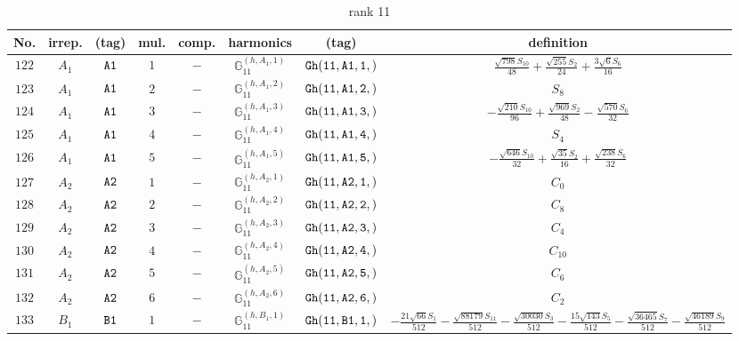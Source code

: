 \documentclass[fleqn,8pt]{jsarticle}
\begin{document}
\begin{table}[ht!]
\begin{center}
\caption{rank 11}
\renewcommand{\arraystretch}{1.3}
\begin{tabular}{cccccccc} \hline \hline
No. & irrep. & (tag) & mul. & comp. & harmonics & (tag) & definition \\ \hline
$ 122 $ & $ A_{1} $ & $ {\tt A1} $ & $ 1 $ & $ - $ & $ \mathbb{G}_{11}^{(h,A_{1},1)} $ & $ {\tt Gh(11,A1,1,)} $ & $ \frac{\sqrt{798} S_{10}}{48} + \frac{\sqrt{255} S_{2}}{24} + \frac{3 \sqrt{6} S_{6}}{16} $ \\
$ 123 $ & $ A_{1} $ & $ {\tt A1} $ & $ 2 $ & $ - $ & $ \mathbb{G}_{11}^{(h,A_{1},2)} $ & $ {\tt Gh(11,A1,2,)} $ & $ S_{8} $ \\
$ 124 $ & $ A_{1} $ & $ {\tt A1} $ & $ 3 $ & $ - $ & $ \mathbb{G}_{11}^{(h,A_{1},3)} $ & $ {\tt Gh(11,A1,3,)} $ & $ - \frac{\sqrt{210} S_{10}}{96} + \frac{\sqrt{969} S_{2}}{48} - \frac{\sqrt{570} S_{6}}{32} $ \\
$ 125 $ & $ A_{1} $ & $ {\tt A1} $ & $ 4 $ & $ - $ & $ \mathbb{G}_{11}^{(h,A_{1},4)} $ & $ {\tt Gh(11,A1,4,)} $ & $ S_{4} $ \\
$ 126 $ & $ A_{1} $ & $ {\tt A1} $ & $ 5 $ & $ - $ & $ \mathbb{G}_{11}^{(h,A_{1},5)} $ & $ {\tt Gh(11,A1,5,)} $ & $ - \frac{\sqrt{646} S_{10}}{32} + \frac{\sqrt{35} S_{2}}{16} + \frac{\sqrt{238} S_{6}}{32} $ \\
$ 127 $ & $ A_{2} $ & $ {\tt A2} $ & $ 1 $ & $ - $ & $ \mathbb{G}_{11}^{(h,A_{2},1)} $ & $ {\tt Gh(11,A2,1,)} $ & $ C_{0} $ \\
$ 128 $ & $ A_{2} $ & $ {\tt A2} $ & $ 2 $ & $ - $ & $ \mathbb{G}_{11}^{(h,A_{2},2)} $ & $ {\tt Gh(11,A2,2,)} $ & $ C_{8} $ \\
$ 129 $ & $ A_{2} $ & $ {\tt A2} $ & $ 3 $ & $ - $ & $ \mathbb{G}_{11}^{(h,A_{2},3)} $ & $ {\tt Gh(11,A2,3,)} $ & $ C_{4} $ \\
$ 130 $ & $ A_{2} $ & $ {\tt A2} $ & $ 4 $ & $ - $ & $ \mathbb{G}_{11}^{(h,A_{2},4)} $ & $ {\tt Gh(11,A2,4,)} $ & $ C_{10} $ \\
$ 131 $ & $ A_{2} $ & $ {\tt A2} $ & $ 5 $ & $ - $ & $ \mathbb{G}_{11}^{(h,A_{2},5)} $ & $ {\tt Gh(11,A2,5,)} $ & $ C_{6} $ \\
$ 132 $ & $ A_{2} $ & $ {\tt A2} $ & $ 6 $ & $ - $ & $ \mathbb{G}_{11}^{(h,A_{2},6)} $ & $ {\tt Gh(11,A2,6,)} $ & $ C_{2} $ \\
$ 133 $ & $ B_{1} $ & $ {\tt B1} $ & $ 1 $ & $ - $ & $ \mathbb{G}_{11}^{(h,B_{1},1)} $ & $ {\tt Gh(11,B1,1,)} $ & $ - \frac{21 \sqrt{66} S_{1}}{512} - \frac{\sqrt{88179} S_{11}}{512} - \frac{\sqrt{30030} S_{3}}{512} - \frac{15 \sqrt{143} S_{5}}{512} - \frac{\sqrt{36465} S_{7}}{512} - \frac{\sqrt{46189} S_{9}}{512} $ \\

\end{tabular}
\end{center}
\end{table}
\end{document}
